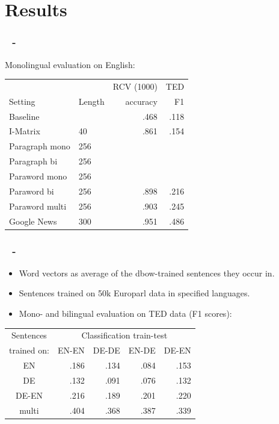 \documentclass{beamer}
\newenvironment{dia}
{
\begin{frame}[fragile, environment=dia]
\frametitle{\insertsection
\ifx\insertsubsection\empty\else
      \,~-~\insertsubsection             %
   \fi}
}
{
\end{frame}
}
\begin{document}
\section{Results}
\begin{dia}
Monolingual evaluation on English:
\begin{table}
\begin{tabular}{l l r r}
 			&		&RCV (1000)		&TED		\\
Setting		&Length	&accuracy		&F1		\\\hline
Baseline		&		&.468			&.118	 	\\
I-Matrix		&40		&.861			&.154		\\
Paragraph mono	&256		&			&		\\
Paragraph bi 	&256		&			&		\\
Paraword mono	&256		&			&		\\
Paraword bi 		&256		&.898			&.216		\\
Paraword multi 	&256		&.903			&.245		\\	
Google News		&300		&.951			&.486		\\
\end{tabular}
\end{table}
\end{dia}


\begin{dia}
\begin{itemize}
\item Word vectors as average of the dbow-trained sentences they occur in.
\item Sentences trained on 50k Europarl data in specified languages.
\item Mono- and bilingual evaluation on TED data (F1 scores):
\end{itemize}
\begin{table}
\begin{tabular}{c |r r r r }
Sentences 		&	\multicolumn{4}{c}{Classification train-test}	\\
trained on: 		&EN-EN	&DE-DE	&EN-DE	&DE-EN	\\\hline
EN			&.186		&.134		&.084		&.153		\\
DE			&.132		&.091		&.076		&.132	\\
DE-EN			&.216		&.189		&.201		&.220		\\
multi 			&.404		&.368		&.387		&.339		\\
\end{tabular}
\end{table}
\end{dia}
\end{document}
